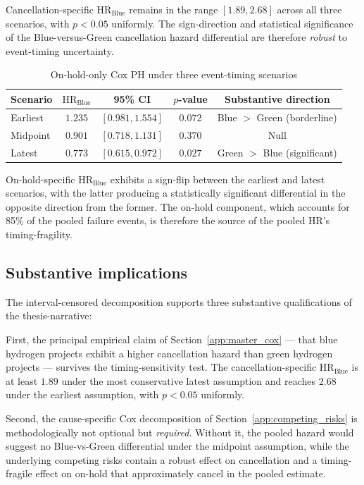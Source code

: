Cancellation-specific $\text{HR}_{\text{Blue}}$ remains in the range $[1.89, 2.68]$ across all three scenarios, with $p < 0.05$ uniformly. The sign-direction and statistical significance of the Blue-versus-Green cancellation hazard differential are therefore \emph{robust} to event-timing uncertainty.

\begin{table}[!htbp]
\centering
\caption{On-hold-only Cox PH under three event-timing scenarios}
\label{tab:app-pijler48-onhold}
\begin{tabular}{lcccc}
\toprule
Scenario & $\text{HR}_{\text{Blue}}$ & 95\% CI & $p$-value & Substantive direction \\
\midrule
Earliest & $1.235$ & $[0.981, 1.554]$ & $0.072$ & Blue $>$ Green (borderline) \\
Midpoint & $0.901$ & $[0.718, 1.131]$ & $0.370$ & Null \\
Latest & $0.773$ & $[0.615, 0.972]$ & $0.027$ & Green $>$ Blue (significant) \\
\bottomrule
\end{tabular}
\end{table}

On-hold-specific $\text{HR}_{\text{Blue}}$ exhibits a sign-flip between the earliest and latest scenarios, with the latter producing a statistically significant differential in the opposite direction from the former. The on-hold component, which accounts for 85\% of the pooled failure events, is therefore the source of the pooled HR's timing-fragility.

\subsection*{Substantive implications}

The interval-censored decomposition supports three substantive qualifications of the thesis-narrative:

First, the principal empirical claim of Section~\ref{app:master_cox} --- that blue hydrogen projects exhibit a higher cancellation hazard than green hydrogen projects --- survives the timing-sensitivity test. The cancellation-specific $\text{HR}_{\text{Blue}}$ is at least $1.89$ under the most conservative latest assumption and reaches $2.68$ under the earliest assumption, with $p < 0.05$ uniformly.

Second, the cause-specific Cox decomposition of Section~\ref{app:competing_risks} is methodologically not optional but \emph{required}. Without it, the pooled hazard would suggest no Blue-vs-Green differential under the midpoint assumption, while the underlying competing risks contain a robust effect on cancellation and a timing-fragile effect on on-hold that approximately cancel in the pooled estimate.

